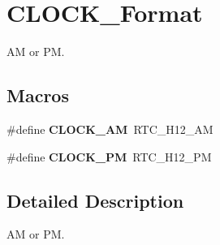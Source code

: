 \hypertarget{group___c_l_o_c_k___format}{}\section{C\+L\+O\+C\+K\+\_\+\+Format}
\label{group___c_l_o_c_k___format}


AM or PM.  


\subsection*{Macros}
\begin{DoxyCompactItemize}
\item 
\mbox{\label{group___c_l_o_c_k___format_gae4cd6ada23b2e1749a2fd828cba94f5a}} 
\#define {\bfseries C\+L\+O\+C\+K\+\_\+\+AM}~R\+T\+C\+\_\+\+H12\+\_\+\+AM
\item 
\mbox{\label{group___c_l_o_c_k___format_ga8978739eedb215b454cc9615031685d9}} 
\#define {\bfseries C\+L\+O\+C\+K\+\_\+\+PM}~R\+T\+C\+\_\+\+H12\+\_\+\+PM
\end{DoxyCompactItemize}


\subsection{Detailed Description}
AM or PM. 

